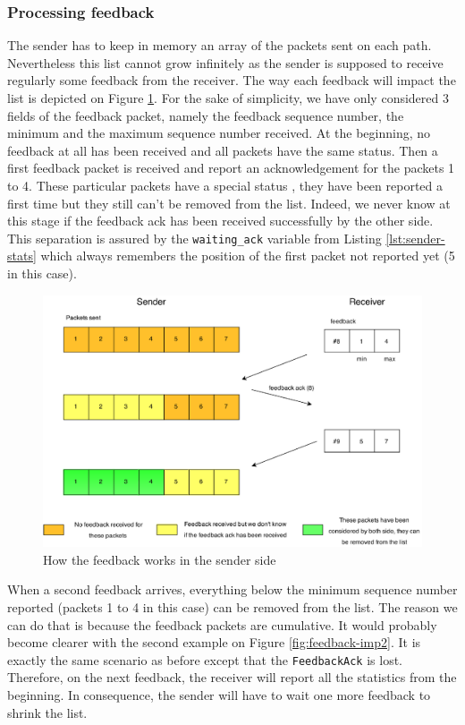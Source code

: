 \subsubsection{Processing feedback}

The sender has to keep in memory an array of the packets sent on each path. Nevertheless this list cannot grow infinitely as the sender is supposed to receive regularly some feedback from the receiver. The way each feedback will impact the list is depicted on Figure \ref{fig:feedback-imp1}. For the sake of simplicity, we have only considered 3 fields of the feedback packet, namely the feedback sequence number, the minimum and the maximum sequence number received. At the beginning, no feedback at all has been received and all packets have the same status. Then a first feedback packet is received and report an acknowledgement for the packets 1 to 4. These particular packets have a special status , they have been reported a first time but they still can't be removed from the list. Indeed, we never know at this stage if the feedback ack has been received successfully by the other side. This separation is assured by the \texttt{waiting\_ack} variable from Listing \ref{lst:sender-stats} which always remembers the position of the first packet not reported yet (5 in this case). 

\begin{figure}[!ht]
\centering
\includegraphics[width=\textwidth]{images/Feedback-implem1.eps}
\caption{How the feedback works in the sender side}
\label{fig:feedback-imp1}
\end{figure}


When a second feedback arrives, everything below the minimum sequence number reported (packets 1 to 4 in this case) can be removed from the list. The reason we can do that is because the feedback packets are cumulative. It would probably become clearer with the second example on Figure \ref{fig:feedback-imp2}. It is exactly the same scenario as before except that the \texttt{FeedbackAck} is lost. Therefore, on the next feedback, the receiver will report all the statistics from the beginning. In consequence, the sender will have to wait one more feedback to shrink the list.

